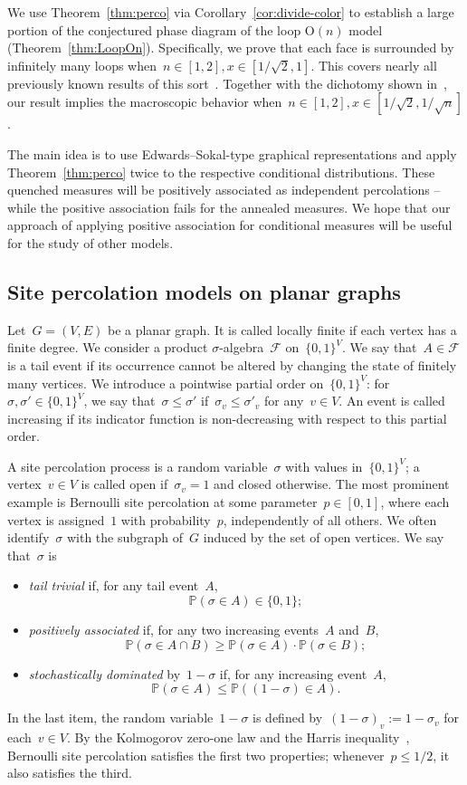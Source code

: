 \documentclass[11pt,letterpaper]{amsart}
\newcounter{n}
\numberwithin{n}{section}
\theoremstyle{plain}
\theoremstyle{definition}
\theoremstyle{remark}
\renewcommand\O[1]{\(\mathrm{O}(#1)\)}
\renewcommand\P{\mathbb P}
\newcommand\calF{\mathcal F}
\newcommand{\1}{\mathbbm{1}}
\begin{document}
We use Theorem~\ref{thm:perco} via Corollary~\ref{cor:divide-color} to establish a large portion of the conjectured phase diagram of the loop \O{n} model (Theorem~\ref{thm:LoopOn}). 
Specifically, we prove that each face is surrounded by infinitely many loops when~$n \in [1,2], x \in [1/\sqrt{2},1]$.
This covers nearly all previously known results of this sort~\cite{DumGlaPel21,GlaMan21,CraGlaHarPel25,GlaLam25}.
Together with the dichotomy shown in~\cite{DumGlaPel21}, our result implies the macroscopic behavior when~$n \in [1,2], x \in [1/\sqrt{2},1/\sqrt{n}]$.

The main idea is to use Edwards--Sokal-type graphical representations and apply Theorem~\ref{thm:perco} twice to the respective conditional distributions. These quenched measures will be positively associated as independent percolations  -- while the positive association fails for the annealed measures. We hope that our approach of applying positive association for conditional measures will be useful for the study of other models.


\subsection{Site percolation models on planar graphs}

Let~$G=(V,E)$ be a planar graph.
It is called locally finite if each vertex has a finite degree.
We consider a product $\sigma$-algebra~$\calF$ on~$\{0,1\}^V$. 
We say that~$A\in\calF$ is a tail event if its occurrence cannot be altered by changing the state of finitely many vertices.
We introduce a pointwise partial order on~$\{0,1\}^V$: for~$\sigma,\sigma'\in \{0,1\}^V$, we say that~$\sigma\leq\sigma'$ if~$\sigma_v\leq \sigma'_v$ for any~$v\in V$.
An event is called increasing if its indicator function is non-decreasing with respect to this partial order.

A site percolation process is a random variable~$\sigma$ with values in~$\{0,1\}^V$; a vertex~$v\in V$ is called open if~$\sigma_v=1$ and closed otherwise.
The most prominent example is Bernoulli site percolation at some parameter~$p\in [0,1]$, where each vertex is assigned~$1$ with probability~$p$, independently of all others.
We often identify~$\sigma$ with the subgraph of~$G$ induced by the set of open vertices.
We say that~$\sigma$ is
\begin{itemize}
	\item {\em tail trivial} if, for any tail event~$A$,
	\[
		\P(\sigma\in A)\in \{0,1\};
	\]
	\item {\em positively associated} if, for any two increasing events~$A$ and~$B$,
	\[
		\P(\sigma\in A\cap B)\geq \P(\sigma\in A) \cdot \P(\sigma\in B);
	\]
	\item {\em stochastically dominated} by~$1-\sigma$ if, for any increasing event~$A$,
	\[
		\P(\sigma\in A) \leq \P((1-\sigma)\in A).
	\]
\end{itemize}
In the last item, the random variable~$1-\sigma$ is defined by~$(1-\sigma)_v:=1-\sigma_v$ for each~$v\in V$.
By the Kolmogorov zero-one law and the Harris inequality~\cite{Har60}, Bernoulli site percolation satisfies the first two properties; whenever~$p\leq 1/2$, it also satisfies the third.
\end{document}
